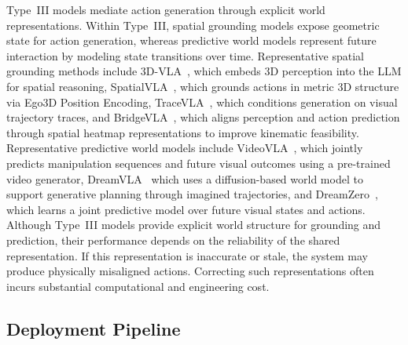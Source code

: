 \documentclass[acmsmall,screen,review]{acmart}
\begin{document}
Type~III models mediate action generation through explicit world representations.
Within Type~III, spatial grounding models expose geometric state for action generation, whereas predictive world models represent future interaction by modeling state transitions over time.
Representative spatial grounding methods include 3D-VLA~\cite{zhen20243dvla}, which embeds 3D perception into the LLM for spatial reasoning,
SpatialVLA~\cite{qu2025spatialvla}, which grounds actions in metric 3D structure via Ego3D Position Encoding,
TraceVLA~\cite{zheng2025tracevla}, which conditions generation on visual trajectory traces,
and BridgeVLA~\cite{li2025bridgevla}, which aligns perception and action prediction through spatial heatmap representations to improve kinematic feasibility.
Representative predictive world models include VideoVLA~\cite{shen2025videovla}, which jointly predicts manipulation sequences and future visual outcomes using a pre-trained video generator,
DreamVLA~\cite{zhang2025dreamvla} which uses a diffusion-based world model to support generative planning through imagined trajectories,
and DreamZero~\cite{ye2026dreamzero}, which learns a joint predictive model over future visual states and actions.
Although Type~III models provide explicit world structure for grounding and prediction, their performance depends on the reliability of the shared representation.
If this representation is inaccurate or stale, the system may produce physically misaligned actions.
Correcting such representations often incurs substantial computational and engineering cost.

\subsection{Deployment Pipeline}\label{sec:deployment_pipeline}
\end{document}
